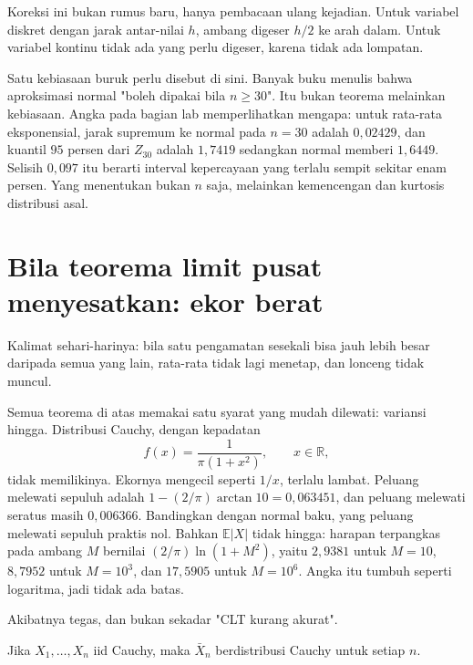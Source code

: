 Koreksi ini bukan rumus baru, hanya pembacaan ulang kejadian. Untuk variabel
diskret dengan jarak antar-nilai $h$, ambang digeser $h/2$ ke arah dalam. Untuk
variabel kontinu tidak ada yang perlu digeser, karena tidak ada lompatan.

Satu kebiasaan buruk perlu disebut di sini. Banyak buku menulis bahwa
aproksimasi normal "boleh dipakai bila $n\ge30$". Itu bukan teorema melainkan
kebiasaan. Angka pada bagian lab memperlihatkan mengapa: untuk rata-rata
eksponensial, jarak supremum ke normal pada $n=30$ adalah $0{,}02429$, dan
kuantil $95$ persen dari $Z_{30}$ adalah $1{,}7419$ sedangkan normal memberi
$1{,}6449$. Selisih $0{,}097$ itu berarti interval kepercayaan yang terlalu
sempit sekitar enam persen. Yang menentukan bukan $n$ saja, melainkan kemencengan
dan kurtosis distribusi asal.

\section{Bila teorema limit pusat menyesatkan: ekor berat}

Kalimat sehari-harinya: bila satu pengamatan sesekali bisa jauh lebih besar
daripada semua yang lain, rata-rata tidak lagi menetap, dan lonceng tidak muncul.


Semua teorema di atas memakai satu syarat yang mudah dilewati: variansi hingga.
Distribusi Cauchy, dengan kepadatan
\[
f(x)=\frac{1}{\pi(1+x^2)},\qquad x\in\mathbb{R},
\]
tidak memilikinya. Ekornya mengecil seperti $1/x$, terlalu lambat. Peluang
melewati sepuluh adalah $1-(2/\pi)\arctan 10=0{,}063451$, dan peluang melewati
seratus masih $0{,}006366$. Bandingkan dengan normal baku, yang peluang melewati
sepuluh praktis nol. Bahkan $\mathbb{E}|X|$ tidak hingga: harapan terpangkas pada
ambang $M$ bernilai $(2/\pi)\ln(1+M^2)$, yaitu $2{,}9381$ untuk $M=10$,
$8{,}7952$ untuk $M=10^3$, dan $17{,}5905$ untuk $M=10^6$. Angka itu tumbuh
seperti logaritma, jadi tidak ada batas.

Akibatnya tegas, dan bukan sekadar "CLT kurang akurat".

\begin{proposisi}
Jika $X_1,\dots,X_n$ iid Cauchy, maka $\bar X_n$ berdistribusi Cauchy untuk
setiap $n$.
\end{proposisi}

